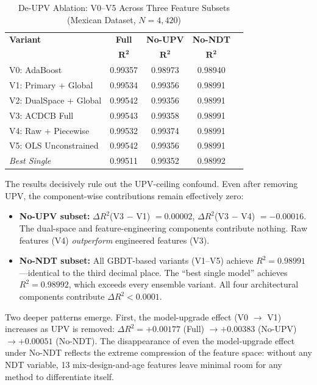 \documentclass[journal]{IEEEtran}
\begin{document}
\begin{table}[!t]
\renewcommand{\arraystretch}{1.15}
\caption{De-UPV Ablation: V0--V5 Across Three Feature Subsets (Mexican Dataset, $N=4{,}420$)}
\label{tab:deupv_ablation}
\centering
\footnotesize
\begin{tabular}{lcccc}
\toprule
\textbf{Variant} & \textbf{Full} & \textbf{No-UPV} & \textbf{No-NDT} \\
 & $\boldsymbol{R^2}$ & $\boldsymbol{R^2}$ & $\boldsymbol{R^2}$ \\
\midrule
V0: AdaBoost              & 0.99357 & 0.98973 & 0.98940 \\
V1: Primary + Global      & 0.99534 & 0.99356 & 0.98991 \\
V2: DualSpace + Global    & 0.99542 & 0.99356 & 0.98991 \\
V3: ACDCB Full            & 0.99543 & 0.99358 & 0.98991 \\
V4: Raw + Piecewise       & 0.99532 & 0.99374 & 0.98991 \\
V5: OLS Unconstrained     & 0.99542 & 0.99356 & 0.98991 \\
\midrule
\textit{Best Single} & 0.99511 & 0.99352 & 0.98992 \\
\bottomrule
\end{tabular}
\end{table}

The results decisively rule out the UPV-ceiling confound. Even after removing UPV, the component-wise contributions remain effectively zero:

\begin{itemize}
\item \textbf{No-UPV subset:} $\Delta R^2$(V3 $-$ V1) $= 0.00002$, $\Delta R^2$(V3 $-$ V4) $= -0.00016$. The dual-space and feature-engineering components contribute nothing. Raw features (V4) \emph{outperform} engineered features (V3).
\item \textbf{No-NDT subset:} All GBDT-based variants (V1--V5) achieve $R^2 = 0.98991$---identical to the third decimal place. The ``best single model'' achieves $R^2 = 0.98992$, which exceeds every ensemble variant. All four architectural components contribute $\Delta R^2 < 0.0001$.
\end{itemize}

Two deeper patterns emerge. First, the model-upgrade effect (V0 $\to$ V1) increases as UPV is removed: $\Delta R^2 = +0.00177$ (Full) $\to +0.00383$ (No-UPV) $\to +0.00051$ (No-NDT). The disappearance of even the model-upgrade effect under No-NDT reflects the extreme compression of the feature space: without any NDT variable, 13 mix-design-and-age features leave minimal room for any method to differentiate itself.
\end{document}
